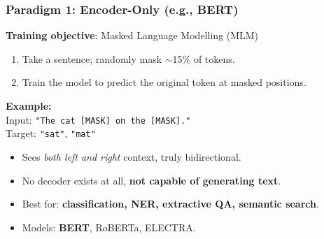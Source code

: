\begin{frame}[fragile]\frametitle{Paradigm 1: Encoder-Only (e.g., BERT)}
    \textbf{Training objective}: Masked Language Modelling (MLM)
    \begin{enumerate}
    \item Take a sentence; randomly mask $\sim$15\% of tokens.
    \item Train the model to predict the original token at masked positions.
    \end{enumerate}
    \vspace{0.3em}
    \textbf{Example:}\\
    Input: \texttt{"The cat [MASK] on the [MASK]."}\\
    Target: \texttt{"sat"}, \texttt{"mat"}
    \vspace{0.3em}
    \begin{itemize}
    \item Sees \emph{both left and right} context,  truly bidirectional.
    \item No decoder exists at all,  \textbf{not capable of generating text}.
    \item Best for: \textbf{classification, NER, extractive QA, semantic search}.
    \item Models: \textbf{BERT}, RoBERTa, ELECTRA.
    \end{itemize}
\end{frame}

